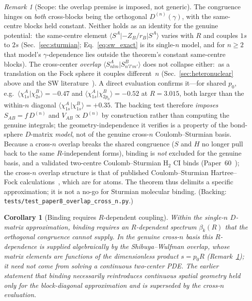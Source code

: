 \documentclass[aps,pra,twocolumn,superscriptaddress,longbibliography]{revtex4-2}
\newtheorem{corollary}{Corollary}
\theoremstyle{remark}
\newtheorem{remark}{Remark}
\theoremstyle{plain}
\begin{document}
\begin{remark}[Scope: the overlap premise is imposed, not generic]
\label{rem:overlap_imposed}
The congruence hinges on \emph{both} cross-blocks being the orthogonal
$D^{(n)}(\gamma)$, with the same-centre blocks held constant.  Neither
holds as an identity for the genuine potential:\ the same-centre element
$\langle S^A|{-}Z_B/r_B|S^A\rangle$ varies with $R$ and couples $1s$ to
$2s$ (Sec.~\ref{sec:sturmian}; Eq.~\eqref{eq:sw_exact} is its single-$n$
model, and for $n \ge 2$ that model's $\gamma$-dependence lies outside the
theorem's constant same-centre blocks).  The
cross-center \emph{overlap} $\langle S^A_{nlm}|S^B_{n'l'm'}\rangle$
does not collapse either:\ as a translation on the Fock
sphere it couples different~$n$ (Sec.~\ref{sec:heteronuclear} above and
the SW literature~\cite{Avery2004IJQC,RedWeatherford2004}).  A direct
evaluation confirms it---for shared $p_0$, e.g.\
$\langle\chi^A_{1s}|\chi^B_{2s}\rangle = -0.47$ and
$\langle\chi^A_{1s}|\chi^B_{2p_0}\rangle = -0.52$ at $R=3.015$, both
larger than the within-$n$ diagonal $\langle\chi^A_{1s}|\chi^B_{1s}\rangle
= +0.35$.  The backing test therefore \emph{imposes} $S_{AB} = f\,D^{(n)}$
and $V_{AB}\propto D^{(n)}$ by construction rather than computing the
genuine integrals; the
geometry-independence it verifies is a property of the bond-sphere
$D$-matrix \emph{model}, not of the genuine cross-$n$ Coulomb--Sturmian
basis.  Because a cross-$n$ overlap breaks the shared congruence
($S$ and $H$ no longer pull back to the same $R$-independent forms),
binding is \emph{not} excluded for the genuine basis, and a validated
two-centre Coulomb--Sturmian H$_2$ CI binds (Paper~60~\cite{loutey_paper60});
the cross-$n$ overlap structure is that of published Coulomb--Sturmian
Hartree--Fock calculations~\cite{HerbstAveryDreuw2019}, which are for
atoms.  The theorem thus
delimits a specific approximation; it is not a no-go for Sturmian molecular
binding.  (Backing: \texttt{tests/test\_paper8\_overlap\_cross\_n.py}.)
\end{remark}

\begin{corollary}[Binding requires $R$-dependent coupling]
\label{cor:binding}
Within the single-$n$ $D$-matrix approximation, binding requires an
$R$-dependent spectrum $\beta_k(R)$ that the orthogonal congruence cannot
supply.  In the genuine cross-$n$ basis this $R$-dependence is supplied
\emph{algebraically} by the Shibuya--Wulfman overlap, whose matrix
elements are functions of the dimensionless product $s = p_0 R$
(Remark~\ref{rem:overlap_imposed}); it need not come from solving a
continuous two-center PDE.  The earlier statement that binding necessarily
reintroduces continuous spatial geometry held only for the block-diagonal
approximation and is superseded by the cross-$n$ evaluation.
\end{corollary}
\end{document}
